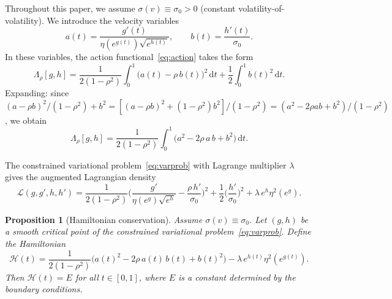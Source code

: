 \documentclass[12pt]{article}
\newtheorem{proposition}[theorem]{Proposition}
\newcommand{\dd}{\mathrm{d}}
\begin{document}
Throughout this paper, we assume $\sigma(v)\equiv\sigma_0>0$ (constant
volatility-of-volatility). We introduce the velocity variables
\begin{equation}\label{eq:ab}
a(t) = \frac{g'(t)}{\eta(e^{g(t)})\sqrt{e^{h(t)}}}, \qquad
b(t) = \frac{h'(t)}{\sigma_0}.
\end{equation}
In these variables, the action functional~\eqref{eq:action} takes the form
\begin{equation}\label{eq:action_ab}
\Lambda_\rho[g,h] = \frac{1}{2(1-\rho^2)}\int_0^1\bigl(a(t)-\rho\,b(t)\bigr)^2\,\dd t
  + \frac{1}{2}\int_0^1 b(t)^2\,\dd t.
\end{equation}
Expanding: since $(a-\rho b)^2/(1-\rho^2) + b^2 = [(a-\rho b)^2 + (1-\rho^2)b^2]/(1-\rho^2) = (a^2-2\rho ab+b^2)/(1-\rho^2)$, we obtain
\begin{equation}\label{eq:action_expanded}
\Lambda_\rho[g,h] = \frac{1}{2(1-\rho^2)}\int_0^1
  \bigl(a^2 - 2\rho\,a\,b + b^2\bigr)\,\dd t.
\end{equation}

The constrained variational problem~\eqref{eq:varprob} with Lagrange multiplier
$\lambda$ gives the augmented Lagrangian density
\begin{equation}\label{eq:Lagrangian}
\mathcal{L}(g,g',h,h') = \frac{1}{2(1-\rho^2)}\biggl(\frac{g'}{\eta(e^g)\sqrt{e^h}}
  - \frac{\rho\,h'}{\sigma_0}\biggr)^{\!2}
  + \frac{1}{2}\biggl(\frac{h'}{\sigma_0}\biggr)^{\!2}
  + \lambda\,e^h\eta^2(e^g).
\end{equation}

\begin{proposition}[Hamiltonian conservation]\label{thm:hamiltonian}
Assume $\sigma(v)\equiv\sigma_0$. Let $(g,h)$ be a smooth critical point of the
constrained variational problem~\eqref{eq:varprob}. Define the Hamiltonian
\begin{equation}\label{eq:H}
\mathcal{H}(t) = \frac{1}{2(1-\rho^2)}\bigl(a(t)^2 - 2\rho\,a(t)\,b(t) + b(t)^2\bigr)
  - \lambda\,e^{h(t)}\eta^2(e^{g(t)}).
\end{equation}
Then $\mathcal{H}(t) = E$ for all $t\in[0,1]$, where $E$ is a constant determined by
the boundary conditions.
\end{proposition}
\end{document}
